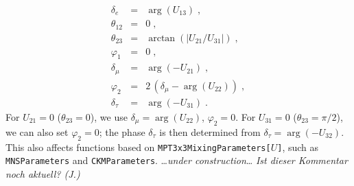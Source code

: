 \documentclass[12pt,a4paper,twoside]{scrartcl}
\newcommand{\function}[1]{{\tt #1}}
\numberwithin{equation}{section}
\numberwithin{table}{section}
\begin{document}
{{\begin{subequations}
\begin{eqnarray}
   \delta_e & = & \arg (U_{13})\;,\\
   \theta_{12} & = & 0\;,\\
   \theta_{23} & = & \arctan (|U_{21}/U_{31}|)\;,\\
   \varphi_1 & = & 0\;,\\
   \delta_\mu & = & \arg(-U_{21})\;,\\
   \varphi_2 & = & 2\,(\delta_\mu - \arg(U_{22}))\;,\\
   \delta_\tau & = & \arg(-U_{31})\;.
\end{eqnarray}
\end{subequations}
For $U_{21}=0$ ($\theta_{23}=0$), we use $\delta_\mu = \arg(U_{22})$,
$\varphi_2 = 0$.  For $U_{31}=0$ ($\theta_{23}=\pi/2$), we can also set
$\varphi_2=0$; the phase $\delta_\tau$ is then determined from
$\delta_\tau = \arg(-U_{32})$.
\\ This also affects functions based on \function{MPT3x3MixingParameters[$U$]},
such as \function{MNSParameters} and \function{CKMParameters}.
\dots\emph{under construction}\dots 
\emph{Ist dieser Kommentar noch aktuell? (J.)}
}}
\end{document}
